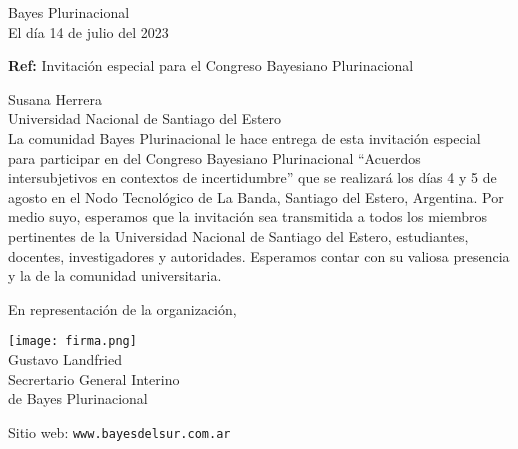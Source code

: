 \documentclass[a4paper,11pt]{letter}
\begin{document}
\begin{letter}{\phantom{.}}


\begin{flushright}
Bayes Plurinacional \\
El día 14 de julio del 2023
\end{flushright}

\vspace{1cm}
\noindent

\hfill \textbf{Ref:} Invitación especial para el Congreso Bayesiano Plurinacional\\

\vspace{1cm}

\noindent Susana Herrera \\
\noindent Universidad Nacional de Santiago del Estero\\ [0.3cm]

\hspace{1cm} La comunidad Bayes Plurinacional le hace entrega de esta invitación especial para participar en del Congreso Bayesiano Plurinacional ``Acuerdos intersubjetivos en contextos de incertidumbre'' que se realizará los días 4 y 5 de agosto en el Nodo Tecnológico de La Banda, Santiago del Estero, Argentina. Por medio suyo, esperamos que la invitación sea transmitida a todos los miembros pertinentes de la Universidad Nacional de Santiago del Estero, estudiantes, docentes, investigadores y autoridades. Esperamos contar con su valiosa presencia y la de la comunidad universitaria.

\vspace{0.3cm}

\hspace{1cm} En representación de la organización,


\begin{flushleft}
\hfill \texttt{[image: firma.png]}\hspace{2cm}\phantom{.} \\[0cm]
\hfill Gustavo Landfried \hspace{2.5cm}\phantom{.}\\ \small
\hfill Secrertario General Interino \hspace{2.5cm}\phantom{.}\\
\hfill de Bayes Plurinacional \hspace{2.5cm}\phantom{.}\\
\end{flushleft}



 \vspace{0.8cm}
\small

 Sitio web: \texttt{www.bayesdelsur.com.ar}



 \end{letter}
\end{document}
